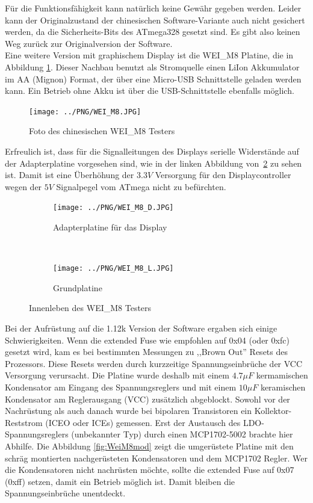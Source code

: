Für die Funktionsfähigkeit kann natürlich keine Gewähr gegeben werden.
Leider kann der Originalzustand der chinesischen Software-Variante auch nicht gesichert werden,
da die Sicherheits-Bits des ATmega328 gesetzt sind.
Es gibt also keinen Weg zurück zur Originalversion der Software.\\ 

Eine weitere Version mit graphischem Display ist die WEI\_M8 Platine, die in Abbildung \ref{fig:WeiM8}.
Dieser Nachbau benutzt als Stromquelle einen LiIon Akkumulator im AA (Mignon) Format, der über
eine Micro-USB Schnittstelle geladen werden kann. Ein Betrieb ohne Akku ist über die USB-Schnittstelle
ebenfalls möglich.

\begin{figure}[H]
\centering
\texttt{[image: ../PNG/WEI\_M8.JPG]}	%
\caption{Foto des chinesischen WEI\_M8 Testers}
\label{fig:WeiM8}
\end{figure}

Erfreulich ist, dass für die Signalleitungen des Displays serielle Widerstände
auf der Adapterplatine vorgesehen sind, wie in der linken Abbildung von~\ref{fig:WeiM8int}
zu sehen ist. Damit ist eine Überhöhung der \(3.3V\) Versorgung für den Displaycontroller
wegen der \(5V\) Signalpegel vom ATmega nicht zu befürchten.

\begin{figure}[H]
  \begin{subfigure}[b]{.5\textwidth}	%
    \centering
    \texttt{[image: ../PNG/WEI\_M8\_D.JPG]}	%
    \caption{Adapterplatine für das Display}
  \end{subfigure}
  ~
  \begin{subfigure}[b]{.5\textwidth}	%
    \centering
    \texttt{[image: ../PNG/WEI\_M8\_L.JPG]}	%
    \caption{Grundplatine}
  \end{subfigure}
  \caption{Innenleben des WEI\_M8 Testers}
  \label{fig:WeiM8int}
\end{figure}


Bei der Aufrüstung auf die 1.12k Version
der Software ergaben sich einige Schwierigkeiten. Wenn die extended Fuse wie empfohlen auf
0x04 (oder 0xfc) gesetzt wird, kam es bei bestimmten Messungen zu ,,Brown Out'' Resets des
Prozessors. Diese Resets werden durch kurzzeitige Spannungseinbrüche der VCC Versorgung
verursacht. Die Platine wurde deshalb mit einem \(4.7\mu F\) kermamischen Kondensator
am Eingang des Spannungsreglers und mit einem \(10\mu F\) keramischen Kondensator am
Reglerausgang (VCC) zusätzlich abgeblockt. Sowohl vor der Nachrüstung als auch danach
wurde bei bipolaren Transistoren ein Kollektor-Reststrom (ICEO oder ICEs) gemessen.
Erst der Austausch des LDO-Spannungsreglers (unbekannter Typ) durch einen MCP1702-5002
brachte hier Abhilfe. Die Abbildung \ref{fig:WeiM8mod} zeigt die umgerüstete Platine
mit den schräg montierten nachgerüsteten Kondensatoren und dem MCP1702 Regler.
Wer die Kondensatoren nicht nachrüsten möchte, sollte die extended Fuse auf 0x07 (0xff)
setzen, damit ein Betrieb möglich ist. Damit bleiben die Spannungseinbrüche unentdeckt.

